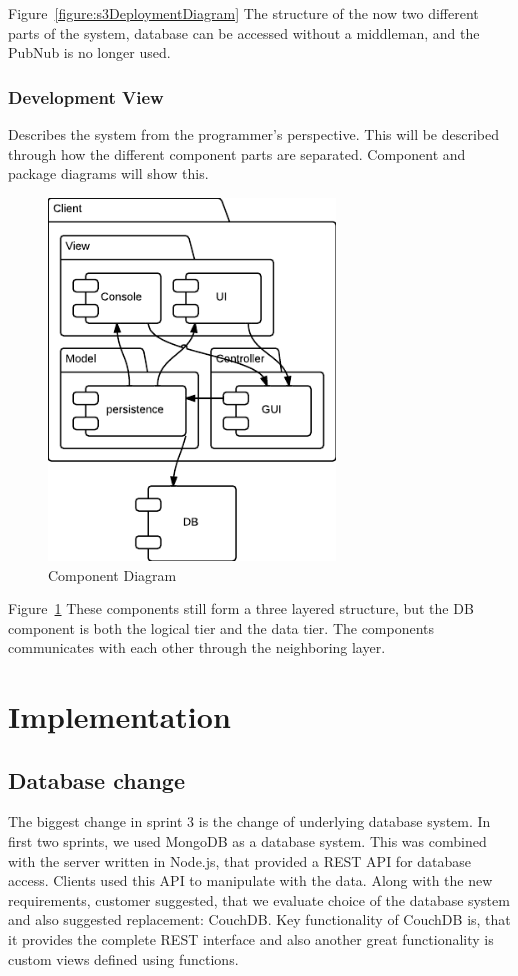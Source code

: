 Figure~\ref{figure:s3DeploymentDiagram} The structure of the now two different parts of the system, database can be accessed without a middleman, and the PubNub is no longer used.

\subsubsection{Development View}
Describes the system from the programmer's perspective. This will be described through how the different component parts are separated. Component and package diagrams will show this.

\begin{figure}[h]
\centering
\includegraphics[width=3in]{image/architecture/s3/s3ComponentDiagram.png}
\caption{Component Diagram}
\label{figure:s3ComponentDiagram}
\end{figure}

Figure~\ref{figure:s3ComponentDiagram} These components still form a three layered structure, but the DB component is both the logical tier and the data tier. The components communicates with each other through the neighboring layer.


\section{Implementation}
\subsection{Database change}
The biggest change in sprint 3 is the change of underlying database system. In first two sprints, we used MongoDB as a database system. This was combined with the server written in Node.js, that provided a REST API for database access. Clients used this API to manipulate with the data. Along with the new requirements, customer suggested, that we evaluate choice of the database system and also suggested replacement: CouchDB. Key functionality of CouchDB is, that it provides the complete REST interface and also another great functionality is custom views defined using functions.

